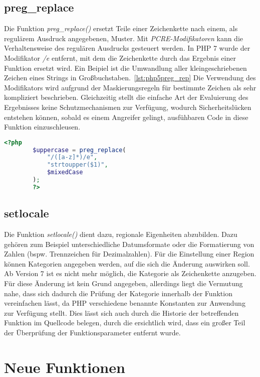     \subsection{preg\_replace}
    Die Funktion \textit{preg\_replace()} ersetzt Teile einer Zeichenkette nach einem, als regulärem Ausdruck angegebenen, Muster. Mit \textit{\acs{PCRE}-Modifikatoren} 
    kann die Verhaltensweise des regulären Ausdrucks gesteuert werden. In \acs{PHP} 7 wurde der Modifikator \textit{/e} entfernt, mit dem die Zeichenkette durch das Ergebnis
    einer Funktion ersetzt wird. Ein Beipiel ist die Umwandlung aller kleingeschriebenen Zeichen eines Strings in Großbuchstaben.~\ref{lst:php5preg_rep} Die Verwendung
    des Modifikators wird aufgrund der Maskierungsregeln für bestimmte Zeichen als sehr kompliziert beschrieben. Gleichzeitig stellt die einfache Art der Evaluierung
    des Ergebnisses keine Schutzmechanismen zur Verfügung, wodurch Sicherheitslücken entstehen können, sobald es einem Angreifer gelingt, ausfühbaren Code in diese
    Funktion einzuschleusen. 

    \begin{lstlisting}[language=php, caption={Beispiel der Benutzung von preg\_replace mit dem Modifikator /e}, label={lst:php5preg_rep}]
        <?php
        $uppercase = preg_replace(
            "/([a-z]*)/e",
            "strtoupper($1)",
            $mixedCase
        );
        ?>
    \end{lstlisting}

    \subsection{setlocale}
    Die Funktion \textit{setlocale()} dient dazu, regionale Eigenheiten abzubilden. Dazu gehören zum Beispiel unterschiedliche Datumsformate oder die Formatierung von 
    Zahlen (bspw. Trennzeichen für Dezimalzahlen). Für die Einstellung einer Region können Kategorien angegeben werden, auf die sich die Änderung auswirken soll. 
    Ab Version 7 ist es nicht mehr möglich, die Kategorie als Zeichenkette anzugeben. Für diese Änderung ist kein Grund angegeben, allerdings liegt die Vermutung
    nahe, dass sich dadurch die Prüfung der Kategorie innerhalb der Funktion vereinfachen lässt, da \acs{PHP} verschiedene benannte Konstanten zur Anwendung zur Verfügung 
    stellt. Dies lässt sich auch durch die Historie der betreffenden Funktion im Quellcode belegen, durch die ersichtlich wird, dass ein großer Teil der Überprüfung
    der Funktionsparameter entfernt wurde. \cite{nikic_remove_2014}

\section{Neue Funktionen}
